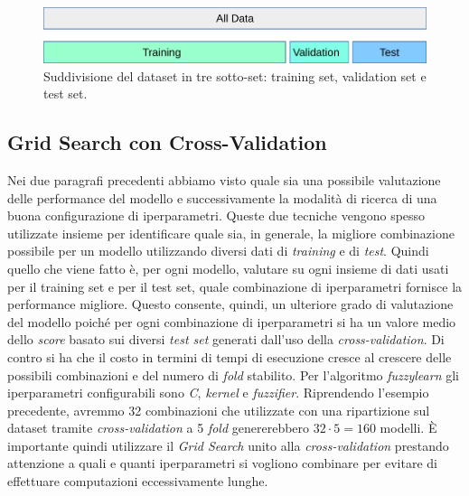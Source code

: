 \documentclass[12pt,italian]{report}
\begin{document}


\begin{figure}[h!]
	\center
	\includegraphics[scale=0.5]{../img/train_test_validation} %
	\caption{Suddivisione del dataset in tre sotto-set: training set, validation set e test set. }
	\label{fig:train_test_validation}
\end{figure}

\subsection{Grid Search con Cross-Validation}
\label{sec:gridsearchcv}
Nei due paragrafi precedenti abbiamo visto quale sia una possibile valutazione delle performance del modello e successivamente la modalità di ricerca di una buona configurazione di iperparametri. Queste due tecniche vengono spesso utilizzate insieme per identificare quale sia, in generale, la migliore combinazione possibile per un modello utilizzando diversi dati di \emph{training} e di \emph{test}.
Quindi quello che viene fatto è, per ogni modello, valutare su ogni insieme di dati usati per il training set e per il test set, quale combinazione di iperparametri fornisce la performance migliore. Questo consente, quindi, un ulteriore grado di valutazione del modello poiché per ogni combinazione di iperparametri si ha un valore medio dello \emph{score} basato sui diversi \emph{test set} generati dall'uso della \emph{cross-validation}. Di contro si ha che il costo in termini di tempi di esecuzione cresce al crescere delle possibili combinazioni e del numero di \emph{fold} stabilito. Per l'algoritmo \emph{fuzzylearn} gli iperparametri configurabili sono \emph{C}, \emph{kernel} e \emph{fuzzifier}. Riprendendo l'esempio precedente, avremmo 32 combinazioni che utilizzate con una ripartizione sul dataset tramite \emph{cross-validation} a 5 \emph{fold} genererebbero $32 \cdot 5 = 160$ modelli.
È importante quindi utilizzare il \emph{Grid Search} unito alla \emph{cross-validation} prestando attenzione a quali e quanti iperparametri si vogliono combinare per evitare di effettuare computazioni eccessivamente lunghe.
\end{document}
